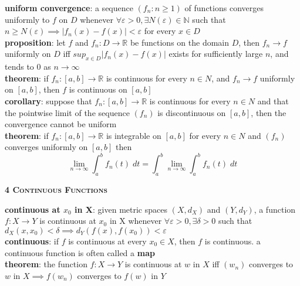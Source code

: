 \documentclass[a4paper]{article}
\newcommand*\abs[1]{\vert #1 \vert}
\begin{document}
\begin{multicols}{2}
\begin{framed}
	\noindent
	\textbf{uniform convergence}: a sequence $(f_n : n \geq 1)$ of functions converges uniformly to $f$ on $D$ whenever $\forall \varepsilon > 0, \exists N(\varepsilon) \in \mathbb{N}$ such that $n \geq N(\varepsilon) \implies \abs{f_n(x) - f(x)} < \varepsilon$ for every $x \in D$\\
	
	\noindent
	\textbf{proposition}: let $f$ and $f_n: D \rightarrow \mathbb{R}$ be functions on the domain $D$, then $f_n \rightarrow f$ uniformly on $D$ iff $sup_{x \in D}\abs{f_n(x) - f(x)}$ exists for sufficiently large $n$, and tends to $0$ as $n \rightarrow \infty$\\
	
	\noindent
	\textbf{theorem}: if $f_n: [a, b] \rightarrow \mathbb{R}$ is continuous for every $n \in N$, and $f_n \rightarrow f$ uniformly on $[a, b]$, then $f$ is continuous on $[a, b]$\\
	
	\noindent
	\textbf{corollary}: suppose that $f_n: [a, b] \rightarrow \mathbb{R}$ is continuous for every $n \in N$ and that the pointwise limit of the sequence $(f_n)$ is discontinuous on $[a, b]$, then the convergence cannot be uniform\\
	
	\noindent
	\textbf{theorem}: if $f_n: [a, b] \rightarrow \mathbb{R}$ is integrable on $[a, b]$ for every $n \in N$ and $(f_n)$ converges uniformly on $[a, b]$ then $$\lim_{n \rightarrow \infty} \int_a^b f_n(t) \; dt = \int_a^b \lim_{n \rightarrow \infty} \int_a^b f_n(t) \; dt$$
\end{framed}

\begin{framed}
	\begin{center}
		\textbf{\textsc{4 Continuous Functions}}
	\end{center}
	\textbf{continuous at $x_0$ in X}: given metric spaces $(X, d_X)$ and $(Y, d_Y)$, a function $f: X \rightarrow Y$ is continuous at $x_0$ in X whenever $\forall \varepsilon > 0, \exists \delta > 0$ such that $d_X(x, x_0) < \delta \implies d_Y(f(x), f(x_0)) < \varepsilon$\\
	
	\noindent
	\textbf{continuous}: if $f$ is continuous at every $x_0 \in X$, then $f$ is continuous. a continuous function is often called a \textbf{map}\\
	
	\noindent
	\textbf{theorem}: the function $f: X \rightarrow Y$ is continuous at $w$ in $X$ iff $(w_n)$ converges to $w$ in $X \implies f(w_n)$ converges to $f(w)$ in $Y$
	

\end{framed}
\end{multicols}
\end{document}
